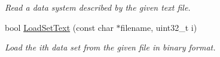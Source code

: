 \begin{DoxyCompactItemize}
\begin{DoxyCompactList}\small\item\em Read a data system described by the given text file. \end{DoxyCompactList}\item 
\hypertarget{struct_d_r_d_s_p_1_1_data_system_typed_a7a895514d71f542392931a54125bc69a}{bool \hyperlink{struct_d_r_d_s_p_1_1_data_system_typed_a7a895514d71f542392931a54125bc69a}{Load\-Set\-Text} (const char $\ast$filename, uint32\-\_\-t i)}\label{struct_d_r_d_s_p_1_1_data_system_typed_a7a895514d71f542392931a54125bc69a}

\begin{DoxyCompactList}\small\item\em Load the ith data set from the given file in binary format. \end{DoxyCompactList}\end{DoxyCompactItemize}
